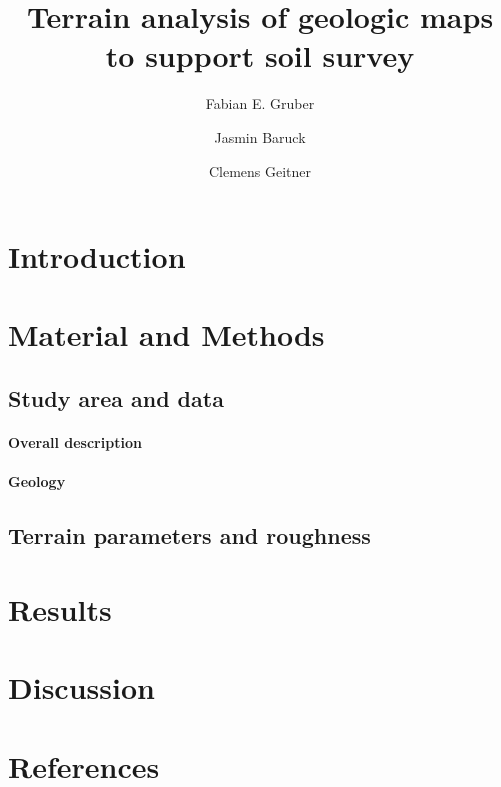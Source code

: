 \documentclass[final,1p,times,twocolumn,authoryear]{elsarticle}
\begin{document}
\begin{frontmatter}

\title{Terrain analysis of geologic maps to support soil survey}


\author{Fabian E. Gruber}
\author{Jasmin Baruck}
\author{Clemens Geitner}

\address{University of Innsbruck}

\begin{abstract}

\end{abstract}

\begin{keyword}

\end{keyword}

\end{frontmatter}

\linenumbers

\section{Introduction}

\section{Material and Methods}
\subsection{Study area and data}
\paragraph{Overall description}
\paragraph{Geology}
\subsection{Terrain parameters and roughness}
\citep{Riley1999}
\section{Results}

\section{Discussion}

\clearpage
\section*{References}

\end{document}
